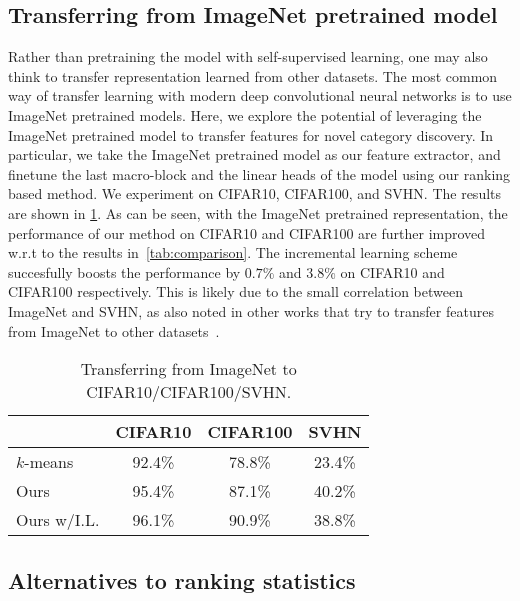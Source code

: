 \subsection{Transferring from ImageNet pretrained model}
\label{s:results_transfer_imagenet}
Rather than pretraining the model with self-supervised learning, one may also think to transfer representation learned from other datasets. The most common way of transfer learning with modern deep convolutional neural networks is to use ImageNet pretrained models. Here, we explore the potential of leveraging the ImageNet pretrained model to transfer features for novel category discovery. In particular, we take the ImageNet pretrained model as our feature extractor, and finetune the last macro-block and the linear heads of the model using our ranking based method. We experiment on CIFAR10, CIFAR100, and SVHN. The results are shown in \cref{tab:imagenet_transfer}. As can be seen, with the ImageNet pretrained representation, the performance of our method on CIFAR10 and CIFAR100 are further improved w.r.t to the results in~\cref{tab:comparison}. The incremental learning scheme succesfully boosts the performance by $0.7\%$ and $3.8\%$ on CIFAR10 and CIFAR100 respectively. 
This is likely due to the small correlation between ImageNet and SVHN, as also noted in other works that try to transfer features from ImageNet to other datasets~\cite{han2019learning,oliver2018realistic}.

\begin{table}[h!]
\centering
\footnotesize
\caption{Transferring from ImageNet to CIFAR10/CIFAR100/SVHN.}\label{tab:imagenet_transfer}
\begin{tabular}{lccc}
\toprule
& CIFAR10 & CIFAR100 & SVHN  \\
\midrule
$k$-means~\cite{MackQueen67_Kmeans} &92.4\%  & 78.8\% & 23.4\% \\
Ours &95.4\% &87.1\% &40.2\% \\
Ours w/I.L. & 96.1\%  & 90.9\% & 38.8\% \\
\bottomrule
\end{tabular}
\end{table}

\subsection{Alternatives to ranking statistics}

